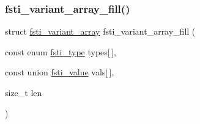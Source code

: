 \mbox{\label{fsti-config_8h_a58182343b78c10550b55c54b4c61ea20}} 
\subsubsection{\texorpdfstring{fsti\+\_\+variant\+\_\+array\+\_\+fill()}{fsti\_variant\_array\_fill()}}
{\footnotesize\ttfamily struct \mbox{\hyperlink{structfsti__variant__array}{fsti\+\_\+variant\+\_\+array}} fsti\+\_\+variant\+\_\+array\+\_\+fill (\begin{DoxyParamCaption}\item[{const enum \mbox{\hyperlink{fsti-defs_8h_ab12bd8dfbafbc55e2015aac7926007cf}{fsti\+\_\+type}}}]{types\mbox{[}$\,$\mbox{]},  }\item[{const union \mbox{\hyperlink{unionfsti__value}{fsti\+\_\+value}}}]{vals\mbox{[}$\,$\mbox{]},  }\item[{size\+\_\+t}]{len }\end{DoxyParamCaption})}

